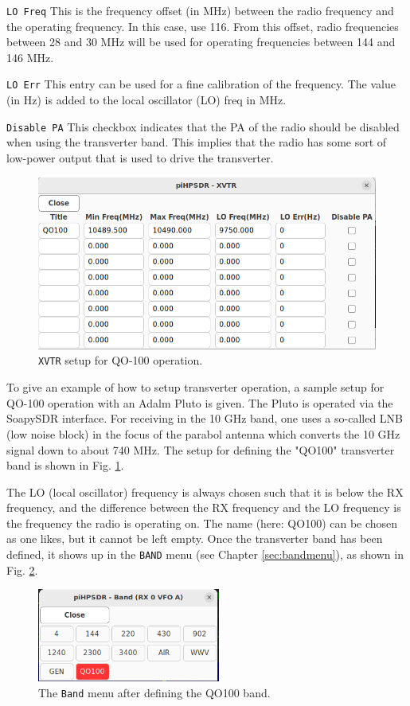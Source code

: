 \documentclass[12pt]{book}
\def\rett#1{\texttt{\color{red}#1}}
\def\bltt#1{\texttt{\color{blue}#1}}
\begin{document}
\rett{LO Freq} This is the frequency offset (in MHz) between the radio frequency and
the operating frequency. In this case, use 116. From this offset, radio frequencies
between 28 and 30 MHz will be used for operating frequencies between 144 and 146 MHz.

\rett{LO Err} This entry can be used for a fine calibration of the frequency. The value
(in Hz) is added to the local oscillator (LO) freq in MHz.

\rett{Disable PA} This checkbox indicates that the PA of the radio should be disabled
when using the transverter band. This implies that the radio has some sort of 
low-power output that is used to drive the transverter.

\begin{figure}[h!]
\center
\includegraphics[width=12cm]{QO100-XVTR.png}
\caption{\bltt{XVTR} setup for QO-100 operation.}
\label{fig:QO100-XVTR}
\end{figure}

To give an example of how to setup transverter operation, a sample setup for QO-100 operation
with an Adalm Pluto is given.
The Pluto is
operated via the SoapySDR interface. For receiving in the 10 GHz band, one uses a so-called
LNB (low noise block) in the focus of the parabol antenna which converts the 10 GHz signal down
to about 740 MHz. The setup for defining the "QO100" transverter band is shown in Fig.
\ref{fig:QO100-XVTR}.

The LO (local oscillator) frequency is always chosen such that it is below the RX frequency,
and the difference between the RX frequency and the LO frequency is the frequency the radio
is operating on. The name (here: QO100) can be chosen as one likes, but it cannot be left
empty. Once the transverter band has been defined, it shows up in the \bltt{BAND} menu
(see Chapter \ref{sec:bandmenu}), as shown in Fig. \ref{fig:QO100-BandMenu}.

\begin{figure}[ht]
\center
\includegraphics[width=6cm]{QO100-BandMenu.png}
\caption{The \bltt{Band} menu after defining the QO100 band.}
\label{fig:QO100-BandMenu}
\end{figure}
\end{document}
